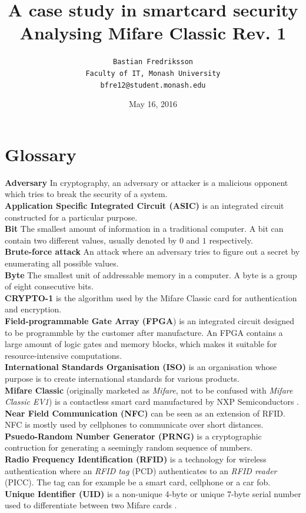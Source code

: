 \documentclass[10pt,twocolumn]{article}
\title{A case study in smartcard security\\Analysing Mifare Classic Rev. 1}
\author{
        \texttt{Bastian Fredriksson}\\
                \texttt{Faculty of IT, Monash University}\\
        \texttt{bfre12@student.monash.edu}\\
}
\date{May 16, 2016}
\begin{document}
\maketitle

\section{Glossary}
\textbf{Adversary} In cryptography, an adversary or attacker is a malicious opponent which tries to break the security of a system.\\
\textbf{Application Specific Integrated Circuit (ASIC)} is an integrated circuit constructed for a particular purpose.\\
\textbf{Bit} The smallest amount of information in a traditional computer. A bit can contain two different values, usually denoted by $0$ and $1$ respectively.\\
\textbf{Brute-force attack} An attack where an adversary tries to figure out a secret by enumerating all possible values.\\
\textbf{Byte} The smallest unit of addressable memory in a computer. A byte is a group of eight consecutive bits.\\
\textbf{CRYPTO-1} is the algorithm used by the Mifare Classic card for authentication and encryption.\\
\textbf{Field-programmable Gate Array (FPGA}) is an integrated circuit designed to be programmble by the customer after manufacture. An FPGA contains a large amount of logic gates and memory blocks, which makes it suitable for resource-intensive computations.\\
\textbf{International Standards Organisation (ISO)} is an organisation whose purpose is to create international standards for various products.\\
\textbf{Mifare Classic} (originally marketed as \textit{Mifare}, not to be confused with \textit{Mifare Classic EV1}) is a contactless smart card manufactured by NXP Semiconductors \cite{mifare-sheet}.\\
\textbf{Near Field Communication (NFC)} can be seen as an extension of RFID. NFC is mostly used by cellphones to communicate over short distances.\\
\textbf{Psuedo-Random Number Generator (PRNG)} is a cryptographic contruction for generating a seemingly random sequence of numbers.\\
\textbf{Radio Frequency Identification (RFID)} is a technology for wireless authentication where an \textit{RFID tag} (PCD) authenticates to an \textit{RFID reader} (PICC). The tag can for example be a smart card, cellphone or a car fob.\\
\textbf{Unique Identifier (UID)} is a non-unique 4-byte or unique 7-byte serial number used to differentiate between two Mifare cards \cite{mifare-sheet}.\\
\end{document}
